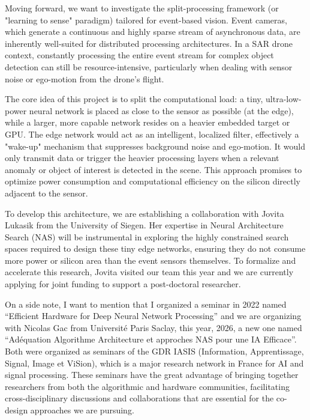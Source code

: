 \documentclass[11pt]{report}
\begin{document}
Moving forward, we want to investigate the split-processing framework (or "learning to sense" paradigm) tailored for event-based vision. Event cameras, which generate a continuous and highly sparse stream of asynchronous data, are inherently well-suited for distributed processing architectures. In a SAR drone context, constantly processing the entire event stream for complex object detection can still be resource-intensive, particularly when dealing with sensor noise or ego-motion from the drone's flight.

The core idea of this project is to split the computational load: a tiny, ultra-low-power neural network is placed as close to the sensor as possible (at the edge), while a larger, more capable network resides on a heavier embedded target or GPU. The edge network would act as an intelligent, localized filter, effectively a "wake-up" mechanism that suppresses background noise and ego-motion. It would only transmit data or trigger the heavier processing layers when a relevant anomaly or object of interest is detected in the scene. This approach promises to optimize power consumption and computational efficiency on the silicon directly adjacent to the sensor.

To develop this architecture, we are establishing a collaboration with Jovita Lukasik from the University of Siegen. Her expertise in Neural Architecture Search (NAS) will be instrumental in exploring the highly constrained search spaces required to design these tiny edge networks, ensuring they do not consume more power or silicon area than the event sensors themselves. To formalize and accelerate this research, Jovita visited our team this year and we are currently applying for joint funding to support a post-doctoral researcher.

On a side note, I want to mention that I organized a seminar in 2022 named ``Efficient Hardware for Deep Neural Network Processing'' and we are organizing with Nicolas Gac from Université Paris Saclay, this year, 2026, a new one named ``Adéquation Algorithme Architecture et approches NAS pour une IA Efficace''. Both were organized as seminars of the GDR IASIS (Information, Apprentissage, Signal, Image et ViSion), which is a major research network in France for AI and signal processing. These seminars have the great advantage of bringing together researchers from both the algorithmic and hardware communities, facilitating cross-disciplinary discussions and collaborations that are essential for the co-design approaches we are pursuing.
\end{document}
